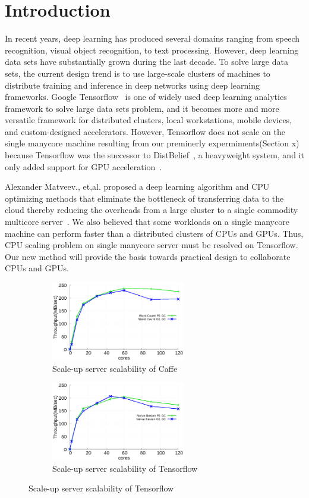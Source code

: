 \documentclass{IOS-Book-Article}
\begin{document}
\section{Introduction}
In recent years, deep learning has produced several domains ranging from speech
recognition, visual object recognition, to text processing.
However, deep learning data sets have substantially grown during the last
decade. 
To solve large data sets, the current design trend is to use large-scale
clusters of machines to distribute training and inference in deep networks
using deep learning frameworks.
Google Tensorflow~\cite{Abadi2016TSL} is one of widely used deep learning
analytics framework to solve large data sets problem, and it becomes more and more versatile
framework for distributed clusters, local workstations, mobile devices, and
custom-designed accelerators.
However, Tensorflow does not scale on the single manycore machine
resulting from our preminerly expermiments(Section x) because Tensorflow was
the successor to DistBelief~\cite{Dean2012LSD}, a heavyweight system, and it
only added support for GPU acceleration~\cite{Abadi2016TSL}.

Alexander Matveev., et,al. proposed a deep learning algorithm and CPU optimizing
methods that eliminate the bottleneck of transferring data to the cloud thereby
reducing the overheads from a large cluster to a single commodity
multicore server~\cite{Matveev2017MPC}.
We also believed that some workloads on a single manycore machine can perform
faster than a distributed clusters of CPUs and GPUs.
Thus, CPU scaling problem on single manycore server must be resolved on
Tensorflow.
Our new method will provide the basis towards practical design to collaborate
CPUs and GPUs.

\begin{figure}[tb]
    \centering
    \begin{subfigure}[b]{0.5\textwidth}
        \includegraphics[width=2.3in]{graph/wc.eps}
        \caption{Scale-up server scalability of Caffe}
    \end{subfigure}%
    \begin{subfigure}[b]{0.5\textwidth}
        \includegraphics[width=2.3in]{graph/nb.eps}
        \caption{Scale-up server scalability of Tensorflow}
    \end{subfigure}%
    \label{fig:docker}
\end{figure}
\end{document}
